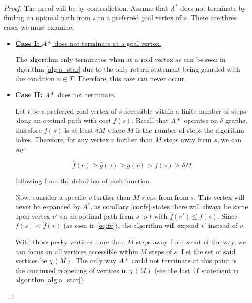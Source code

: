 \documentclass[letterpaper, 10pt]{article}
\theoremstyle{definition}
\theoremstyle{Algorithm}
\begin{document}
\begin{proof}

  The proof will be by contradiction. Assume that $A^*$ does not
  terminate by finding an optimal path from $s$ to a preferred 
  goal vertex of $s$. There are three cases we must examine:
 
  \begin{itemize}

    \item \underline{\textbf{Case I:} $A*$ does not terminate at
      a goal vertex.}

      The algorithm only terminates when at a goal vertex as
      can be seen in algorithm \ref{alg:a_star} due to the only
      return statement being guarded with the condition $n\in T$.
      Therefore, this case can never occur.

    \item \underline{\textbf{Case II:} $A*$ does not terminate.}

      Let $t$ be a preferred goal vertex of $s$ accessible
      within a finite number of steps along an optimal
      path with cost $f(s)$. Recall that $A*$ operates on
      $\delta$ graphs, therefore $f(s)$ is at least $\delta M$
      where $M$ is the number of steps the algorithm takes.
      Therefore, for any vertex $v$ farther than $M$ steps
      away from $s$, we can say
      
      \begin{equation}\label{eq:fv}
        \hat{f}(v) \geq \hat{g}(v) \geq g(v) > f(s) \geq \delta M
      \end{equation}
      
      \noindent following from the definition of each function.
      
      Now, consider a specific $v$ further than $M$ steps from
      from $s$. This vertex will never be expanded by $A^*$,
      as corollary \ref{cor:fs} states there will always be some
      open vertex $v'$ on an optimal path from $s$ to $t$
      with $\hat{f}(v') \leq f(s)$.
      Since $f(s) < \hat{f}(v)$ (as seen in \eqref{eq:fv}), 
      the algorithm will expand $v'$ instead of $v$.

      With those pesky vertices more than $M$ steps away from
      $s$ out of the way, we can focus on all vertices accessible
      within $M$ steps of $s$. Let the set of said vertices be
      $\chi(M)$. The only way $A*$ could not terminate at this
      point is the continued reopening of vertices in $\chi(M)$
      (see the last \texttt{if} statement in algorithm \ref{alg:a_star}).


\end{itemize}
\end{proof}
\end{document}
